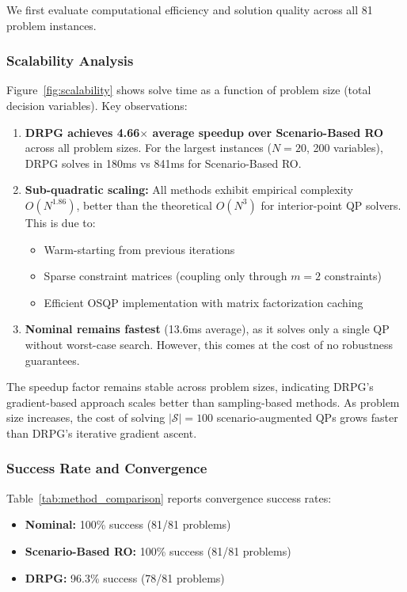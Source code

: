 We first evaluate computational efficiency and solution quality across all 81 problem instances.

\subsubsection{Scalability Analysis}

Figure~\ref{fig:scalability} shows solve time as a function of problem size (total decision variables). Key observations:

\begin{enumerate}
    \item \textbf{DRPG achieves 4.66$\times$ average speedup over Scenario-Based RO} across all problem sizes. For the largest instances ($N=20$, 200 variables), DRPG solves in 180ms vs 841ms for Scenario-Based RO.

    \item \textbf{Sub-quadratic scaling:} All methods exhibit empirical complexity $O(N^{1.86})$, better than the theoretical $O(N^3)$ for interior-point QP solvers. This is due to:
    \begin{itemize}
        \item Warm-starting from previous iterations
        \item Sparse constraint matrices (coupling only through $m=2$ constraints)
        \item Efficient OSQP implementation with matrix factorization caching
    \end{itemize}

    \item \textbf{Nominal remains fastest} (13.6ms average), as it solves only a single QP without worst-case search. However, this comes at the cost of no robustness guarantees.
\end{enumerate}

The speedup factor remains stable across problem sizes, indicating DRPG's gradient-based approach scales better than sampling-based methods. As problem size increases, the cost of solving $|\mathcal{S}| = 100$ scenario-augmented QPs grows faster than DRPG's iterative gradient ascent.

\subsubsection{Success Rate and Convergence}

Table~\ref{tab:method_comparison} reports convergence success rates:
\begin{itemize}
    \item \textbf{Nominal:} 100\% success (81/81 problems)
    \item \textbf{Scenario-Based RO:} 100\% success (81/81 problems)
    \item \textbf{DRPG:} 96.3\% success (78/81 problems)
\end{itemize}

